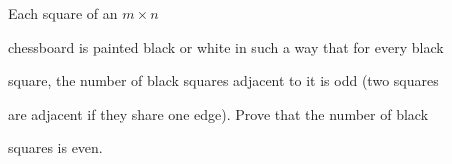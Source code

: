 Each square of an $m\times n$

 chessboard is painted black or white in such a way that for every black

 square, the number of black squares adjacent to it is odd (two squares 

are adjacent if they share one edge). Prove that the number of black 

squares is even.